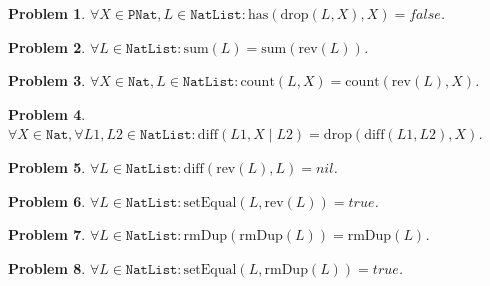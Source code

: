 \documentclass[12pt, a4paper]{article}
\newtheorem{problem}{Problem}
\newcommand{\rel}[1]{\mathrel{#1}}
\newcommand{\rmx}[1]{\mathrm{#1}}
\begin{document}
\begin{problem}
$\forall X \in \mathtt{PNat}, L \in \mathtt{NatList} \colon \rmx{has}(\rmx{drop}(L, X), X) = false$.
\end{problem}

\begin{problem}
$\forall L \in \mathtt{NatList} \colon \rmx{sum}(L) = \rmx{sum}(\rmx{rev}(L))$.
\end{problem}

\begin{problem}
$\forall X \in \mathtt{Nat}, L \in \mathtt{NatList} \colon \rmx{count}(L, X) = \rmx{count}(\rmx{rev}(L), X)$.
\end{problem}

\begin{problem}
$\forall X \in \mathtt{Nat}, \forall L1, L2 \in \mathtt{NatList} \colon \rmx{diff}(L1, X \mid L2) = \rmx{drop}(\rmx{diff}(L1, L2), X)$.
\end{problem}

\begin{problem}
$\forall L \in \mathtt{NatList} \colon \rmx{diff}(\rmx{rev}(L), L) = nil$.
\end{problem}

\begin{problem}
$\forall L \in \mathtt{NatList} \colon \rmx{setEqual}(L, \rmx{rev}(L)) = true$.
\end{problem}

\begin{problem}
$\forall L \in \mathtt{NatList} \colon \rmx{rmDup}(\rmx{rmDup}(L)) = \rmx{rmDup}(L)$.
\end{problem}

\begin{problem}
$\forall L \in \mathtt{NatList} \colon \rmx{setEqual}(L, \rmx{rmDup}(L)) = true$.
\end{problem}


%
%
\end{document}

